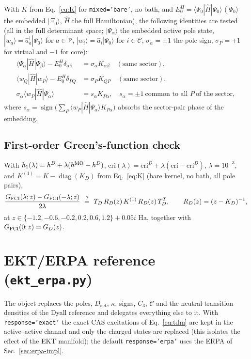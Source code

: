 \documentclass[11pt,a4paper]{article}
\newcommand{\ket}[1]{|#1\rangle}
\newcommand{\braket}[1]{\langle#1\rangle}
\newcommand{\code}[1]{\texttt{#1}}
\newcommand{\act}{\mathrm{act}}
\begin{document}
With $K$ from Eq.~\eqref{eq:K} for \code{mixed='bare'}, no bath, and
$E_0^{H}=\braket{\Psi_0|\hat H|\Psi_0}$ ($\ket{\Psi_0}$ the embedded
$\ket{\Xi_0}$, $\hat H$ the full Hamiltonian), the following identities are
tested (all in the full determinant space; $\ket{\Psi_\alpha}$ the embedded
active pole state, $\ket{w_a}=\hat a_a^\dagger\ket{\Psi_0}$ for $a\in\mathcal V$,
$\ket{w_i}=\hat a_i\ket{\Psi_0}$ for $i\in\mathcal C$, $\sigma_\alpha=\pm1$
the pole sign, $\sigma_P=+1$ for virtual and $-1$ for core):
\begin{align}
  \braket{\Psi_\alpha|\hat H|\Psi_\beta}-E_0^{H}\delta_{\alpha\beta}&=\sigma_\alpha K_{\alpha\beta}\quad(\text{same sector}),
  \label{eq:chk-aa}\\
  \braket{w_Q|\hat H|w_P}-E_0^{H}\delta_{PQ}&=\sigma_P K_{QP}\quad(\text{same sector}),
  \label{eq:chk-ii}\\
  \sigma_\alpha\braket{w_P|\hat H|\Psi_\alpha}&=s_\alpha K_{P\alpha},\quad s_\alpha=\pm1\ \text{common to all }P\ \text{of the sector},
  \label{eq:chk-ia}
\end{align}
where $s_\alpha=\operatorname{sign}\bigl(\sum_P\braket{w_P|\hat H|\Psi_\alpha}K_{P\alpha}\bigr)$
absorbs the sector-pair phase of the embedding.

\subsection{First-order Green's-function check}

With $h_1(\lambda)=h^{D}+\lambda(h^{\rm MO}-h^{D})$,
$\mathrm{eri}(\lambda)=\mathrm{eri}^{D}+\lambda(\mathrm{eri}-\mathrm{eri}^{D})$,
$\lambda=10^{-3}$, and $K^{(1)}=K-\operatorname{diag}(K_D)$ from
Eq.~\eqref{eq:K} (bare kernel, no bath, all pole pairs),
\begin{equation}
  \frac{G_{\rm FCI}(\lambda;z)-G_{\rm FCI}(-\lambda;z)}{2\lambda}
  \ \stackrel{?}{=}\ T_D\,R_D(z)\,K^{(1)}\,R_D(z)\,T_D^{T},\qquad R_D(z)=(z-K_D)^{-1},
  \label{eq:chk-fd}
\end{equation}
at $z\in\{-1.2,-0.6,-0.2,0.2,0.6,1.2\}+0.05i$ Ha, together with
$G_{\rm FCI}(0;z)=G_D(z)$.

\section{EKT/ERPA reference (\code{ekt\_erpa.py})}
\label{sec:ekt}

The object replaces the poles, $D_{\act}$, $\kappa$, signs, $C_3$,
$\mathcal C$ and the neutral transition densities of the Dyall reference and
delegates everything else to it.  With \code{response='exact'} the exact CAS
excitations of Eq.~\eqref{eq:tdm} are kept in the active--active channel and
only the charged states are replaced (this isolates the effect of the EKT
manifold); the default \code{response='erpa'} uses the ERPA of
Sec.~\ref{sec:erpa-impl}.
\end{document}
